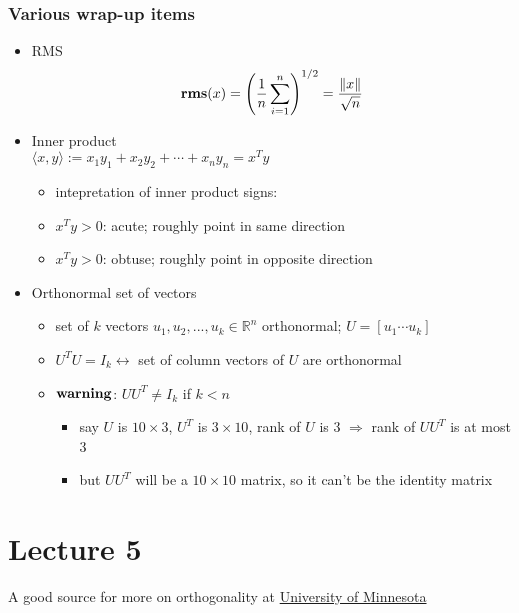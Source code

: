 \documentclass[10pt,letterpaper]{article}
\begin{document}
\subsubsection{Various wrap-up items}
\label{sec-2_2_6}
\begin{itemize}

\item RMS\\
\label{sec-2_2_6_1}%
\[
{\bf rms} (x) = \left( \frac{1}{n} \sum^n _{i=1} \right) ^{1/2} = \frac{\| x \|}{\sqrt{n}} 
\]

\item Inner product\\
\label{sec-2_2_6_2}%
$\langle x,y \rangle := x_1 y_1 + x_2 y_2 + \cdots + x_n y_n = x ^{T} y$ 
\begin{itemize}
\item intepretation of inner product signs:
\item $x ^{T} y > 0$: acute; roughly point in same direction
\item $x ^{T} y > 0$: obtuse; roughly point in opposite direction
\end{itemize}

\item Orthonormal set of vectors
\label{sec-2_2_6_3}%
\begin{itemize}
\item set of $k$ vectors $u_1, u_2, ..., u_k \in \mathbb{R}^{n}$ orthonormal; $U= [u_1 \cdots u_k]$
\item $U^T U= I_k \leftrightarrow$ set of column vectors of $U$ are orthonormal
\item ${\bf warning}$: $U U ^{T} \ne I_k$ if $k<n$

\begin{itemize}
\item say $U$ is $10\times 3$, $U^T$ is $3 \times 10$, rank of $U$ is 3 $\Rightarrow$ rank of $UU^T$ is at most 3
\item but $UU^T$ will be a $10\times 10$ matrix, so it can't be the identity matrix
\end{itemize}

\end{itemize}

\end{itemize} %
\section{Lecture 5}
\label{sec-3}

A good source for more on orthogonality at \href{http://www.math.umn.edu/~olver/aims_/qr.pdf}{University of Minnesota}
\end{document}

